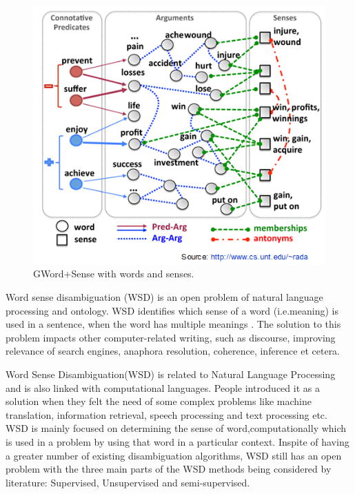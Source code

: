 \begin{figure}[tbh]
	\begin{center}
		\includegraphics[width=\columnwidth]{Union_Background_Chart_WSD}
	\end{center}
	\caption{GWord+Sense with words and senses. \label{fig1}}
\end{figure}

Word sense disambiguation (WSD) is an open problem of natural language processing and ontology. WSD identifies which sense of a word (i.e.meaning) is used in a sentence, when the word has multiple meanings \cite{Du2013}. The solution to this problem impacts other computer-related writing, such as discourse, improving relevance of search engines, anaphora resolution, coherence, inference et cetera.

Word Sense Disambiguation(WSD) is related to Natural Language Processing and is also linked with computational languages. People introduced it as a solution when they felt the need of some complex problems like machine translation, information retrieval, speech processing and text processing etc. WSD is mainly focused on determining the sense of word,computationally which is used in a problem by using that word in a particular context. Inspite of having a greater number of existing disambiguation algorithms, WSD still has an open problem with the three main parts of the WSD methods being considered by literature: Supervised, Unsupervised and semi-supervised. 

